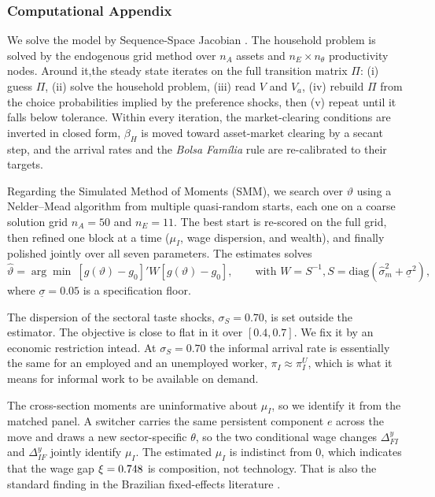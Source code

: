 \documentclass[12pt]{article}
\begin{document}
\subsubsection*{Computational Appendix}

We solve the model by Sequence-Space Jacobian \parencite{auclert2021using}. The
household problem is solved by the endogenous grid method over $n_A$ assets and
$n_E \times n_\theta$ productivity nodes. Around it,the steady state iterates on the
full transition matrix $\Pi$: (i) guess $\Pi$, (ii) solve the household problem, (iii)
read $V$ and $V_a$, (iv) rebuild $\Pi$ from the choice probabilities implied by the
preference shocks, then (v) repeat until it falls below tolerance. Within every
iteration, the market-clearing conditions are inverted in closed form, $\beta_H$ is
moved toward asset-market clearing by a secant step, and the arrival rates and the
\textit{Bolsa Família} rule are re-calibrated to their targets.

Regarding the Simulated Method of Moments (SMM), we search over $\vartheta$ using a
Nelder–Mead algorithm from multiple quasi-random starts, each one on a coarse solution
grid $n_A=50$ and $n_E=11$. The best start is re-scored on the full grid, then refined
one block at a time ($\mu_I$, wage dispersion, and wealth), and finally polished jointly
over all seven parameters. The estimates solves
\[
\hat\vartheta = \arg\min\ \left[g(\vartheta) - g_0\right]' W \left[g(\vartheta) - g_0\right],
\qquad \text{with } W = S^{-1}, S = \mathrm{diag}(\hat{\sigma}^2_m + \underline{\sigma}^2),
\]
where $\underline{\sigma} = 0.05$ is a specification floor.

The dispersion of the sectoral taste shocks, $\sigma_S = 0.70$, is set outside the
estimator. The objective is close to flat in it over $[0.4,0.7]$. We fix it by an
economic restriction intead. At $\sigma_S = 0.70$ the informal arrival rate is
essentially the same for an employed and an unemployed worker, $\pi_I \approx \pi_I^U$,
which is what it means for informal work to be available on demand.

The cross-section moments are uninformative about $\mu_I$, so we identify it from the
matched panel. A switcher carries the same persistent component $e$ across the move and
draws a new sector-specific $\theta$, so the two conditional wage changes
$\Delta^y_{FI}$ and $\Delta^y_{IF}$ jointly identify $\mu_I$. The estimated $\mu_I$ is
indistinct from $0$, which indicates that the wage gap $\xi=0.748$ is composition, not
technology. That is also the standard finding in the Brazilian fixed-effects literature
\parencite{bargain2011earnings}.
\end{document}
